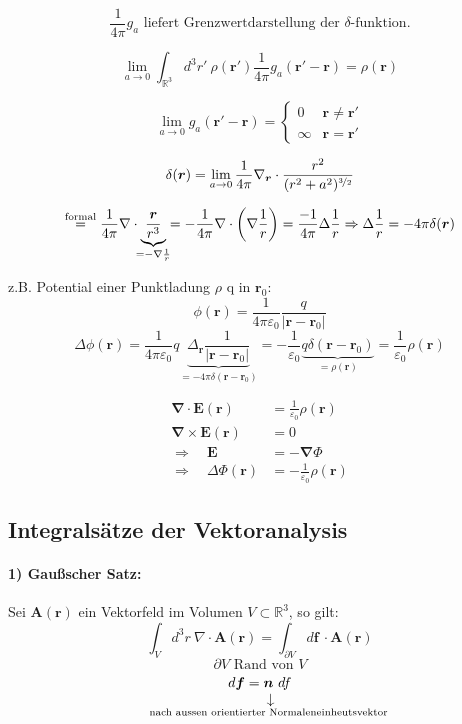 \documentclass[titlepage,11pt,a4paper,ngerman]{report}
\newcommand{\tx}[1]{\textrm{#1}}
\newcommand{\custo}[3]{\underset{\scriptstyle\overset{\mkern4mu\rotatebox{-90}{$\,#1$}}{#3}}{#2}}
\newcommand{\kq}{\frac{1}{4\pi\epsilon_0}}
\renewcommand{\vec}[1]{\boldsymbol{#1}}
\renewcommand{\epsilon}{\varepsilon}
\newcommand{\bbb}[2]{\begin{tcolorbox}[colback=white,colframe=black,fonttitle=\bfseries,title=#1,sharp corners,tcbox raise base]#2\end{tcolorbox}}
\begin{document}
$$\frac{1}{4 \pi} g_a \textrm{ liefert Grenzwertdarstellung der $\delta$-funktion.}$$

$$\lim_{a\to 0} \int_{\mathbb{R}^3} d^3r'\ \rho(\vec{r}') \frac{1}{4\pi}g_a(\vec{r}'-\vec{r})=\rho(\vec{r})$$

$$\lim_{a \to 0} g_a(\vec{r}' - \vec{r}) = \left\{ \begin{array}{cc}
0 		& \vec{r} \neq  \vec{r}'\\
\infty 	& \vec{r} = 	\vec{r}'
\end{array} \right.$$

$$\delta(\vec{r}) = \lim_{a \to 0} \frac{1}{4 \pi} \nabla_{\vec{r}} \cdot \frac{r^2}{(r^2+a^2)^{\nicefrac{3}{2}}}$$

$$\overset{\textrm{formal}}{=} \frac{1}{4 \pi} \nabla \cdot \underbrace{\frac{\vec{r}}{r^3}}_{\mathclap{= - \nabla \frac{1}{r}}} = - \frac{1}{4 \pi} \nabla \cdot \bigg(\nabla \frac{1}{r}\bigg) = \frac{-1}{4 \pi} \Delta \frac{1}{r} \Rightarrow \Delta \frac{1}{r} = -4 \pi \delta(\vec{r})$$

z.B. Potential einer Punktladung $\rho$ q in $\vec{r}_0$:
$$\phi(\vec{r}) = \kq \frac{q}{|\vec{r} - \vec{r}_0|}$$
$$\Delta \phi(\vec{r}) = \kq q \underbrace{\Delta_{\vec{r}} \frac{1}{|\vec{r} - \vec{r}_0|} }_{= - 4 \pi \delta(\vec{r} - \vec{r}_0)} = - \frac{1}{\epsilon_0} \underbrace{q \delta(\vec{r} - \vec{r}_0)}_{= \rho(\vec{r})} = \frac{1}{\epsilon_0} \rho(\vec{r})$$


\bbb{Wiederholung}{\begin{align*}
	\vec{\nabla} \cdot \vec{E}(\vec{r}) &= \frac{1}{\epsilon_0} \rho(\vec{r})\\
	\vec{\nabla} \times \vec{E}(\vec{r}) &= 0 \\[10pt]
	\Rightarrow \quad \vec{E} &= - \vec{\nabla} \Phi \\
	\Rightarrow \quad \Delta \Phi (\vec{r}) &= - \frac{1}{\epsilon_0} \rho(\vec{r})
	\end{align*}
}

\subsection{Integralsätze der Vektoranalysis}

\paragraph{1) Gaußscher Satz:} 
Sei $\vec{A}(\vec{r})$ ein Vektorfeld im Volumen $V \subset \mathbb R^3$, so gilt:
$$\int_V d^3r\ \nabla \cdot \vec{A}(\vec{r}) = \int_{\partial V} d\vec{f}\ \cdot \vec{A}(\vec{r})$$
$$\partial V \tx{ Rand von } V$$
$$d \vec{f} = \custo{\rightarrow}{\vec{n}}{\mathclap{\textrm{nach aussen orientierter Normaleneinheutsvektor}}}\ df$$
\end{document}
